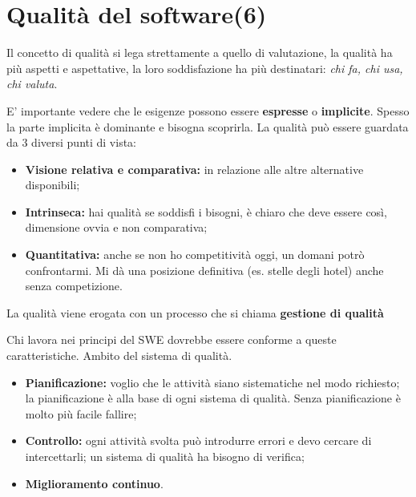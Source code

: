 



\section{Qualità del software(6)}
Il concetto di qualità si lega strettamente a quello di valutazione, la qualità ha più aspetti e aspettative, la loro soddisfazione ha più destinatari: \textit{chi fa, chi usa, chi valuta}.

E' importante vedere che le esigenze possono essere \textbf{espresse} o \textbf{implicite}. Spesso la parte implicita è dominante e bisogna scoprirla. La qualità può essere guardata da 3 diversi punti di vista:

\begin{itemize}

	\item \textbf{Visione relativa e comparativa:} in relazione alle altre alternative disponibili;
	\item \textbf{Intrinseca:} hai qualità se soddisfi i bisogni, è chiaro che deve essere così, dimensione ovvia e non comparativa;
	\item \textbf{Quantitativa:} anche se non ho competitività oggi, un domani potrò confrontarmi. Mi dà una posizione definitiva (es. stelle degli hotel) anche senza competizione.

\end{itemize} 

La qualità viene erogata con un processo che si chiama \textbf{gestione di qualità}

Chi lavora nei principi del SWE dovrebbe essere conforme a queste caratteristiche. Ambito del sistema di qualità.

\begin{itemize}

	\item \textbf{Pianificazione:} voglio che le attività siano sistematiche nel modo richiesto; la pianificazione è alla base di ogni sistema di qualità. Senza pianificazione è molto più facile fallire;
	\item \textbf{Controllo:} ogni attività svolta può introdurre errori e devo cercare di intercettarli; un sistema di qualità ha bisogno di verifica;
	\item \textbf{Miglioramento continuo}.

\end{itemize}


